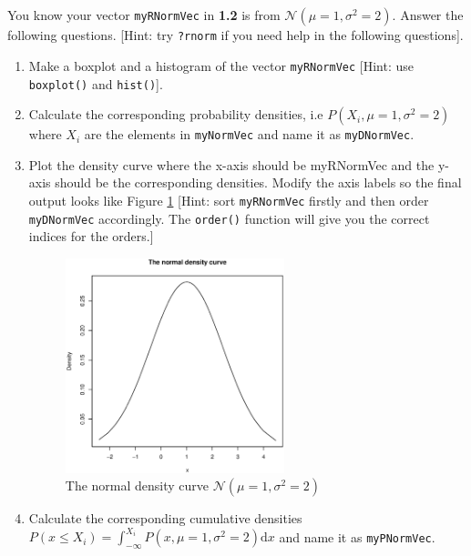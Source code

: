 \documentclass[a4paper]{article}
\begin{document}
\section{}
 You know your vector \texttt{myRNormVec} in \textbf{1.2} is from
  $\mathcal{N}(\mu=1,\sigma^2=2)$. Answer the following questions. [Hint: try \texttt{?rnorm} if you need help
  in the following questions]. 

  \begin{enumerate}
  \item Make a boxplot and a histogram of the vector \texttt{myRNormVec}
    [Hint: use \texttt{boxplot()} and \texttt{hist()}]. 

  \item Calculate the corresponding probability densities, i.e $P(X_i,
    \mu=1,\sigma^2=2)$ where $X_i$ are the elements in \texttt{myNormVec} and
    name it as \texttt{myDNormVec}.

  \item Plot the density curve where the x-axis should be myRNormVec and the
    y-axis should be the corresponding densities. Modify the axis labels so the
    final output looks like Figure \ref{fig:normcurve}   [Hint: sort
    \texttt{myRNormVec} firstly and then order \texttt{myDNormVec}
    accordingly. The \texttt{order()} function will give you the correct indices for the
    orders.]

    \begin{figure}
      \centering
      \includegraphics[width=0.6\textwidth]{NormCur.eps}
      \caption{The normal density curve $\mathcal{N}(\mu=1,\sigma^2=2)$}
      \label{fig:normcurve}
    \end{figure} 


  \item Calculate the  corresponding cumulative densities $P(x\leq X_i)=\int_{-\infty}^{X_i}P(x,
    \mu=1,\sigma^2=2)\mathrm{d}x$ and name it as \texttt{myPNormVec}.



\end{enumerate}
\end{document}
